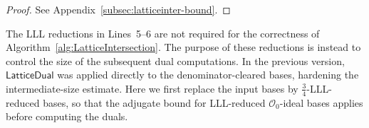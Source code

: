 \begin{proof}
See Appendix~\ref{subsec:latticeinter-bound}.
\end{proof}

\begin{remark}
The LLL reductions in Lines~5--6 are not required for the correctness of Algorithm~\ref{alg:LatticeIntersection}.
The purpose of these reductions is instead to control the size of the subsequent dual computations.
In the previous version, \(\mathsf{LatticeDual}\) was applied directly to the denominator-cleared bases, hardening the intermediate-size estimate.
Here we first replace the input bases by \(\frac34\)-LLL-reduced bases, so that the adjugate bound for LLL-reduced \(\mathcal O_0\)-ideal bases applies before computing the duals.
\end{remark}


